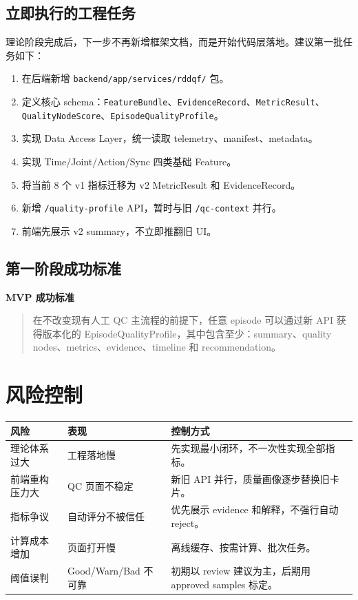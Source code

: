 \documentclass[UTF8,zihao=-4]{ctexart}
\newcommand{\Code}[1]{\texttt{#1}}
\newenvironment{greenbox}[1]{\vspace{0.5em}\noindent\colorbox{SoftGreen}{\parbox{0.96\linewidth}{\textbf{#1}}}\par\vspace{-0.2em}\begin{quote}\small}{\end{quote}\vspace{0.3em}}
\begin{document}
\subsection{立即执行的工程任务}

理论阶段完成后，下一步不再新增框架文档，而是开始代码层落地。建议第一批任务如下：

\begin{enumerate}
\item 在后端新增 \Code{backend/app/services/rddqf/} 包。
\item 定义核心 schema：\Code{FeatureBundle}、\Code{EvidenceRecord}、\Code{MetricResult}、\Code{QualityNodeScore}、\Code{EpisodeQualityProfile}。
\item 实现 Data Access Layer，统一读取 telemetry、manifest、metadata。
\item 实现 Time/Joint/Action/Sync 四类基础 Feature。
\item 将当前 8 个 v1 指标迁移为 v2 MetricResult 和 EvidenceRecord。
\item 新增 \Code{/quality-profile} API，暂时与旧 \Code{/qc-context} 并行。
\item 前端先展示 v2 summary，不立即推翻旧 UI。
\end{enumerate}

\subsection{第一阶段成功标准}

\begin{greenbox}{MVP 成功标准}
在不改变现有人工 QC 主流程的前提下，任意 episode 可以通过新 API 获得版本化的 EpisodeQualityProfile，其中包含至少：summary、quality nodes、metrics、evidence、timeline 和 recommendation。
\end{greenbox}

\section{风险控制}

\begin{longtable}{L{4cm} L{4cm} L{5.8cm}}
\toprule
风险 & 表现 & 控制方式 \\
\midrule
理论体系过大 & 工程落地慢 & 先实现最小闭环，不一次性实现全部指标。 \\
前端重构压力大 & QC 页面不稳定 & 新旧 API 并行，质量画像逐步替换旧卡片。 \\
指标争议 & 自动评分不被信任 & 优先展示 evidence 和解释，不强行自动 reject。 \\
计算成本增加 & 页面打开慢 & 离线缓存、按需计算、批次任务。 \\
阈值误判 & Good/Warn/Bad 不可靠 & 初期以 review 建议为主，后期用 approved samples 标定。 \\
\bottomrule
\end{longtable}
\end{document}

